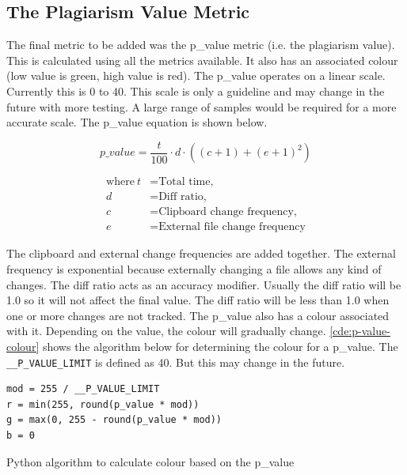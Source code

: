 \subsection{The Plagiarism Value Metric}
\label{sec:the-plagiarism-value-metric}
The final metric to be added was the p\_value metric (i.e. the plagiarism value). This is calculated using all the metrics available. It also has an associated colour (low value is green, high value is red). The p\_value operates on a linear scale. Currently this is 0 to 40. This scale is only a guideline and may change in the future with more testing. A large range of samples would be required for a more accurate scale. The p\_value equation is shown below.

\[
  p\_value = \frac{t}{100} \cdot d \cdot ((c + 1) + (e + 1)^2)
\]

\begin{align*}
  \text{where}~t &= \text{Total time,} \\
  d &= \text{Diff ratio,} \\
  c &= \text{Clipboard change frequency,} \\
  e &= \text{External file change frequency}
\end{align*}

The clipboard and external change frequencies are added together. The external frequency is exponential because externally changing a file allows any kind of changes. The diff ratio acts as an accuracy modifier. Usually the diff ratio will be 1.0 so it will not affect the final value. The diff ratio will be less than 1.0 when one or more changes are not tracked. The p\_value also has a colour associated with it. Depending on the value, the colour will gradually change. \autoref{cde:p-value-colour} shows the algorithm below for determining the colour for a p\_value. The \texttt{\_\_P\_VALUE\_LIMIT} is defined as 40. But this may change in the future.

\begin{code}
\begin{verbatim}
mod = 255 / __P_VALUE_LIMIT
r = min(255, round(p_value * mod))
g = max(0, 255 - round(p_value * mod))
b = 0
\end{verbatim}
\caption{Python algorithm to calculate colour based on the p\_value}
\label{cde:p-value-colour}
\end{code}

